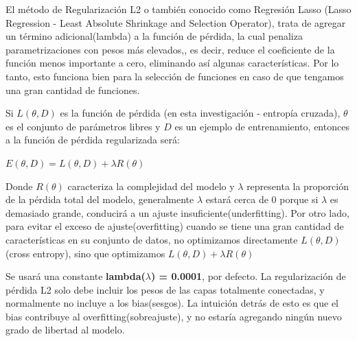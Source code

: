 		

		El método de Regularización L2 o también conocido como Regresión Lasso (Lasso Regression - Least Absolute Shrinkage and Selection Operator), trata de agregar un término adicional(lambda) a la función de pérdida, la cual penaliza parametrizaciones con pesos más elevados,\citep{AulaMLP}, es decir, reduce el coeficiente de la función menos importante a cero, eliminando así algunas características. Por lo tanto, esto funciona bien para la selección de funciones en caso de que tengamos una gran cantidad de funciones.

		Si $L(\theta, D)$ es la función de pérdida (en esta investigación - entropía cruzada), $\theta$ es el conjunto de parámetros libres y $D$ es un ejemplo de entrenamiento, entonces a la función de pérdida regularizada será:

			\begingroup\makeatletter{}\check@mathfonts
			\begin{center}
			$E(\theta,D) =L(\theta,D) +\lambda R(\theta)$
			\end{center}
			\endgroup
		

		Donde $R(\theta)$ caracteriza la complejidad del modelo y $\lambda$ representa la proporción de la pérdida total del modelo, generalmente $\lambda$ estará cerca de 0 porque si $\lambda$ es demasiado grande, conducirá a un ajuste insuficiente(underfitting). Por otro lado, para evitar el exceso de ajuste(overfitting) cuando se tiene una gran cantidad de características en su conjunto de datos, no optimizamos directamente $L(\theta,D)$ (cross entropy), sino que optimizamos $L(\theta,D) +\lambda R(\theta)$

		Se usará una constante {\bf lambda($\lambda$) = 0.0001}, por defecto. La regularización de pérdida L2 solo debe incluir los pesos de las capas totalmente conectadas, y normalmente no incluye a los bias(sesgos). La intuición detrás de esto es que el bias contribuye al overfitting(sobreajuste), y no estaría agregando ningún nuevo grado de libertad al modelo.





